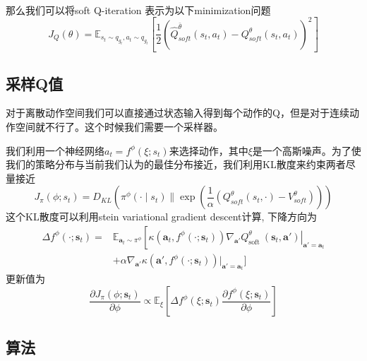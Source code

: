 \documentclass{article}
\newcommand{\nobracket}{}
\begin{document}
\begin{CJK*}{UTF8}{gbsn}
\

那么我们可以将soft Q-iteration 表示为以下minimization问题
\[ J_Q (\theta) =\mathbb{E}_{s_t \sim q_{g_t}, a_t \sim q_{g_t}}  \left[
   \frac{1}{2}  (\hat{Q}_{soft}^{\bar{\theta}} (s_t, a_t) - Q_{soft}^{\theta}
   (s_t, a_t))^2 \right] \]

\subsection{采样Q值}

对于离散动作空间我们可以直接通过状态输入得到每个动作的Q，但是对于连续动作空间就不行了。这个时候我们需要一个采样器。

我们利用一个神经网络$a_t = f^{\phi} (\xi ;
s_t)$来选择动作，其中$\xi$是一个高斯噪声。为了使我们的策略分布与当前我们认为的最佳分布接近，我们利用KL散度来约束两者尽量接近
\[ J_{\pi} (\phi ; s_t) = D_{KL}  \left( \pi^{\phi}  (\cdot \mid s_t) \| \exp
   \left( \frac{1}{\alpha}  (Q_{soft}^{\theta} (s_t, \cdot) -
   V_{soft}^{\theta}) \right) \right) \]
这个KL散度可以利用stein variational gradient descent计算,
下降方向为
\[ \begin{aligned}
     \Delta f^{\phi} (\cdot ; \mathbf{s}_t) = & \mathbb{E}_{\mathbf{a}_t \sim
     \pi^{\phi}} \left[ \left. \kappa (\mathbf{a}_t, f^{\phi} (\cdot ;
     \mathbf{s}_t)) \nabla_{\mathbf{a}'} Q_{\text{soft }}^{\theta}
     (\mathbf{s}_t, \mathbf{a}') \right|_{\mathbf{a}' = \mathbf{a}_t}
     \right.\\
     & \nobracket + \nobracket \alpha \nabla_{\mathbf{a}'} \kappa
     (\mathbf{a}', f^{\phi} (\cdot ; \mathbf{s}_t)) |_{\mathbf{a}' =
     \mathbf{a}_t}]
   \end{aligned} \]
更新值为
\[ \frac{\partial J_{\pi} (\phi ; \mathbf{s}_t)}{\partial \phi} \propto
   \mathbb{E}_{\xi}  \left[ \Delta f^{\phi} (\xi ; \mathbf{s}_t)
   \frac{\partial f^{\phi} (\xi ; \mathbf{s}_t)}{\partial \phi} \right] \]

\subsection{算法}


\end{CJK*}
\end{document}
